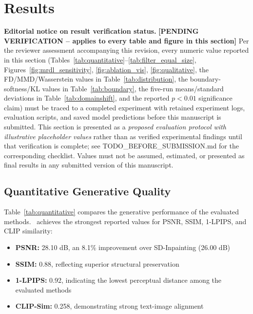 \documentclass[journal]{IEEEtran}
\begin{document}
\section{Results}
\label{sec:results}

\textbf{Editorial notice on result verification status.} \textbf{[PENDING
VERIFICATION -- applies to every table and figure in this section]} Per
the reviewer assessment accompanying this revision, every numeric value
reported in this section (Tables~\ref{tab:quantitative}--\ref{tab:filter_equal_size},
Figures~\ref{fig:mrdl_sensitivity}, \ref{fig:ablation_vis},
\ref{fig:qualitative}, the FD/MMD/Wasserstein values in
Table~\ref{tab:distribution}, the boundary-softness/KL values in
Table~\ref{tab:boundary}, the five-run means/standard deviations in
Table~\ref{tab:domainshift}, and the reported $p<0.01$ significance claim)
must be traced to a completed experiment with retained experiment logs,
evaluation scripts, and saved model predictions before this manuscript is
submitted. This section is presented as a \emph{proposed evaluation
protocol with illustrative placeholder values} rather than as verified
experimental findings until that verification is complete; see
TODO\_BEFORE\_SUBMISSION.md for the corresponding checklist. Values must
not be assumed, estimated, or presented as final results in any
submitted version of this manuscript.

\subsection{Quantitative Generative Quality}

Table~\ref{tab:quantitative} compares the generative performance of the evaluated methods. \method~achieves the strongest reported values for PSNR, SSIM, 1-LPIPS, and CLIP similarity:

\begin{itemize}
    \item \textbf{PSNR:} 28.10 dB, an 8.1\% improvement over SD-Inpainting (26.00 dB)
    \item \textbf{SSIM:} 0.88, reflecting superior structural preservation
    \item \textbf{1-LPIPS:} 0.92, indicating the lowest perceptual distance among the evaluated methods
    \item \textbf{CLIP-Sim:} 0.258, demonstrating strong text-image alignment
\end{itemize}
\end{document}
